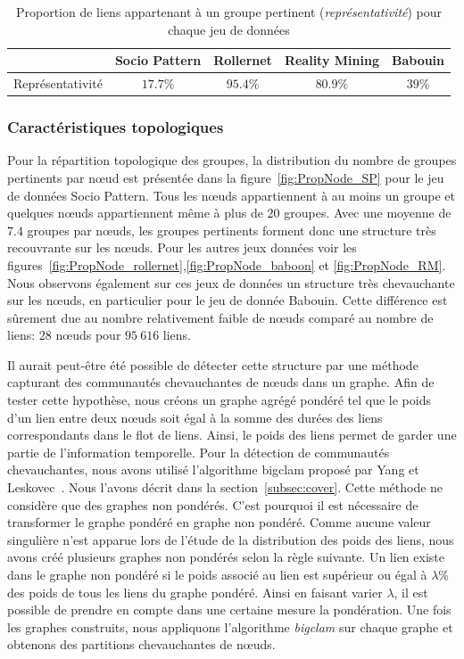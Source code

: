 \begin{table}
\centering
\begin{tabular}{|c|c|c|c|c|}
\hline \rule[-1ex]{0pt}{3.5ex}
 & Socio Pattern & Rollernet  & Reality Mining & Babouin \\
\hline
Représentativité & $17.7\%$ & $95.4\%$ & $80.9\%$ & $39\%$ \\

\hline
\end{tabular}
\caption{Proportion de liens appartenant à un groupe pertinent (\emph{représentativité}) pour chaque jeu de données}
\label{tab:res_representativite}       %
\end{table}


\subsubsection{Caractéristiques topologiques}
Pour la répartition topologique des groupes, la distribution du nombre de groupes pertinents par n\oe{}ud est présentée dans la figure~\ref{fig:PropNode_SP} pour le jeu de données Socio Pattern.
Tous les n\oe{}uds appartiennent à au moins un groupe et quelques n\oe{}uds appartiennent même à plus de $20$ groupes.
Avec une moyenne de $7.4$ groupes par n\oe{}uds, les groupes pertinents forment donc une structure très recouvrante sur les n\oe{}uds.
Pour les autres jeux données voir les figures~\ref{fig:PropNode_rollernet},\ref{fig:PropNode_baboon} et \ref{fig:PropNode_RM}.
Nous observons également sur ces jeux de données un structure très chevauchante sur les n\oe{}uds, en particulier pour le jeu de donnée Babouin.
Cette différence est sûrement due au nombre relativement faible de n\oe{}uds comparé au nombre de liens: $28$ n\oe{}uds pour $95\ 616$ liens.

\bigskip

Il aurait peut-être été possible de détecter cette structure par une méthode capturant des communautés chevauchantes de n\oe{}uds dans un graphe.
Afin de tester cette hypothèse, nous créons un graphe agrégé pondéré tel que le poids d'un lien entre deux n\oe{}uds soit égal à la somme des durées des liens correspondants dans le flot de liens.
Ainsi, le poids des liens permet de garder une partie de l'information temporelle.
Pour la détection de communautés chevauchantes, nous avons utilisé l'algorithme bigclam proposé par Yang et Leskovec~\cite{Yang2013}.
Nous l'avons décrit dans la section~\ref{subsec:cover}.
Cette méthode ne considère que des graphes non pondérés.
C'est pourquoi il est nécessaire de transformer le graphe pondéré en graphe non pondéré.
Comme aucune valeur singulière n'est apparue lors de l'étude de la distribution des poids des liens, nous avons créé plusieurs graphes non pondérés selon la règle suivante.
Un lien existe dans le graphe non pondéré si le poids associé au lien est supérieur ou égal à $\lambda\%$ des poids de tous les liens du graphe pondéré.
Ainsi en faisant varier $\lambda$, il est possible de prendre en compte dans une certaine mesure la pondération.
Une fois les graphes construits, nous appliquons l'algorithme \emph{bigclam} sur chaque graphe et obtenons des partitions chevauchantes de n\oe{}uds.

